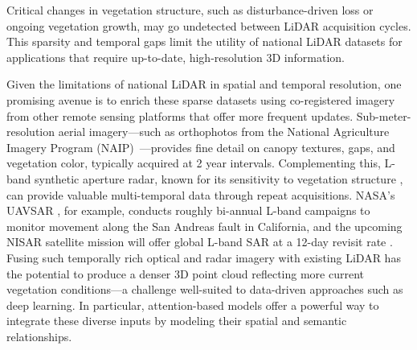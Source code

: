 \documentclass[12pt]{report}
\begin{document}
Critical changes in vegetation structure, such as disturbance-driven loss or ongoing vegetation growth, may go undetected between LiDAR acquisition cycles. This sparsity and temporal gaps limit the utility of national LiDAR datasets for applications that require up-to-date, high-resolution 3D information.

Given the limitations of national LiDAR in spatial and temporal resolution, one promising avenue is to enrich these sparse datasets using co-registered imagery from other remote sensing platforms that offer more frequent updates. Sub-meter-resolution aerial imagery—such as orthophotos from the National Agriculture Imagery Program (NAIP)~\citep{usda_naip_2024}—provides fine detail on canopy textures, gaps, and vegetation color, typically acquired at 2 year intervals. Complementing this, L-band synthetic aperture radar, known for its sensitivity to vegetation structure \citep{wang2025interpretable}, can provide valuable multi-temporal data through repeat acquisitions. NASA’s UAVSAR \citep{rosen2006uavsar}, for example, conducts roughly bi-annual L-band campaigns to monitor movement along the San Andreas fault in California, and the upcoming NISAR satellite mission will offer global L-band SAR at a 12-day revisit rate \citep{kellogg2020nasa}. Fusing such temporally rich optical and radar imagery with existing LiDAR has the potential to produce a denser 3D point cloud reflecting more current vegetation conditions—a challenge well-suited to data-driven approaches such as deep learning. In particular, attention-based models offer a powerful way to integrate these diverse inputs by modeling their spatial and semantic relationships.
\end{document}
